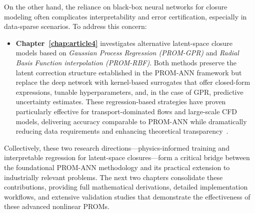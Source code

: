 On the other hand, the reliance on black-box neural networks for closure modeling often complicates interpretability and error certification, especially in data-sparse scenarios. To address this concern:
\begin{itemize}
    \item \textbf{Chapter~\ref{chap:article4}} investigates alternative latent-space closure models based on \emph{Gaussian Process Regression (PROM-GPR)} and \emph{Radial Basis Function interpolation (PROM-RBF)}. Both methods preserve the latent correction structure established in the PROM-ANN framework but replace the deep network with kernel-based surrogates that offer closed-form expressions, tunable hyperparameters, and, in the case of GPR, predictive uncertainty estimates. These regression-based strategies have proven particularly effective for transport-dominated flows and large-scale CFD models, delivering accuracy comparable to PROM-ANN while dramatically reducing data requirements and enhancing theoretical transparency~\cite{de2025nonlinear}.
\end{itemize}

Collectively, these two research directions---physics-informed training and interpretable regression for latent-space closures---form a critical bridge between the foundational PROM-ANN methodology and its practical extension to industrially relevant problems. The next two chapters consolidate these contributions, providing full mathematical derivations, detailed implementation workflows, and extensive validation studies that demonstrate the effectiveness of these advanced nonlinear PROMs.





